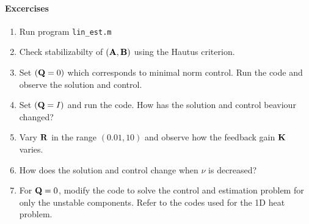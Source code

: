 \documentclass[12pt]{article}
\begin{document}
\paragraph{Excercises}

\begin{enumerate}

\item Run program {\tt lin\_est.m}

\item Check stabilizabilty of $({\mathbf A},{\mathbf B})$ using the Hautus criterion.

\item Set $({\mathbf Q} = 0)$ which corresponds to minimal norm control. Run the code and observe the solution and control.

\item Set $({\mathbf Q} = I)$ and run the code. How has the solution and control beaviour changed?

\item Vary ${\mathbf R}$ in the range $(0.01,10)$ and observe how the feedback gain ${\mathbf K}$ varies.

\item How does the solution and control change when $\nu$ is decreased?

\item For ${\mathbf Q} = 0$, modify the code to solve the control and estimation problem for only the unstable components. Refer to the codes used for the 1D heat problem.
\end{enumerate}


\end{document}

